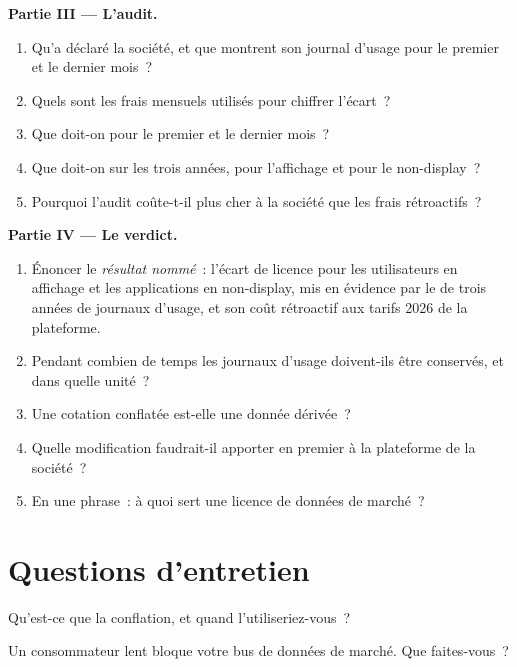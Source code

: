 \begin{problem}
\medskip\noindent\textbf{Partie III --- L'audit.}
\begin{enumerate}[resume]
\item Qu'a déclaré la société, et que montrent son journal d'usage pour le premier et le dernier mois~?
\item Quels sont les frais mensuels utilisés pour chiffrer l'écart~?
\item Que doit-on pour le premier et le dernier mois~?
\item Que doit-on sur les trois années, pour l'affichage et pour le non-display~?
\item Pourquoi l'audit coûte-t-il plus cher à la société que les frais rétroactifs~?
\end{enumerate}

\medskip\noindent\textbf{Partie IV --- Le verdict.}
\begin{enumerate}[resume]
\item Énoncer le \emph{résultat nommé}~: l'écart de licence pour les utilisateurs en affichage et les applications en non-display, mis en évidence par le  de trois années de
journaux d'usage, et son coût rétroactif aux tarifs 2026 de la plateforme.
\item Pendant combien de temps les journaux d'usage doivent-ils être conservés, et dans quelle unité~?
\item Une cotation conflatée est-elle une donnée dérivée~?
\item Quelle modification faudrait-il apporter en premier à la plateforme de la société~?
\item En une phrase~: à quoi sert une licence de données de marché~?
\end{enumerate}
\end{problem}

\section{Questions d'entretien}

\begin{interviewq}\label{iq:pl:market-data-distribution-and-entitlements:1}
Qu'est-ce que la conflation, et quand l'utiliseriez-vous~?
\end{interviewq}

\begin{interviewq}\label{iq:pl:market-data-distribution-and-entitlements:2}
Un consommateur lent bloque votre bus de données de marché. Que faites-vous~?
\end{interviewq}

